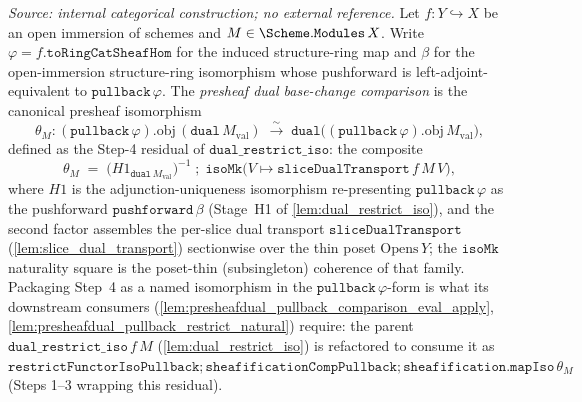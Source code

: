 \begin{definition}

  \label{def:presheafdual_pullback_comparison}
  \textit{Source: internal categorical construction; no external reference.}
  Let \(f : Y \hookrightarrow X\) be an open immersion of schemes and
  \(M \in \Scheme.\mathtt{Modules}\,X\). Write \(\varphi = f.\mathtt{toRingCatSheafHom}\) for the
  induced structure-ring map and \(\beta\) for the open-immersion structure-ring isomorphism whose
  pushforward is left-adjoint-equivalent to \(\mathtt{pullback}\,\varphi\). The \emph{presheaf dual
  base-change comparison} is the canonical presheaf isomorphism
  \[
    \theta_M : (\mathtt{pullback}\,\varphi).\mathrm{obj}\,(\mathtt{dual}\,M_{\mathrm{val}})
      \;\xrightarrow{\ \sim\ }\;
      \mathtt{dual}\bigl((\mathtt{pullback}\,\varphi).\mathrm{obj}\,M_{\mathrm{val}}\bigr),
  \]
  defined as the Step-4 residual of \(\mathtt{dual\_restrict\_iso}\): the composite
  \[
    \theta_M \;=\; \bigl(H1_{\mathtt{dual}\,M_{\mathrm{val}}}\bigr)^{-1}
      \;\mathbin{;}\; \mathtt{isoMk}\bigl(V \mapsto \mathtt{sliceDualTransport}\,f\,M\,V\bigr),
  \]
  where \(H1\) is the adjunction-uniqueness isomorphism re-presenting \(\mathtt{pullback}\,\varphi\) as
  the pushforward \(\mathtt{pushforward}\,\beta\) (Stage~H1 of \cref{lem:dual_restrict_iso}), and the
  second factor assembles the per-slice dual transport \(\mathtt{sliceDualTransport}\)
  (\cref{lem:slice_dual_transport}) sectionwise over the thin poset \(\mathrm{Opens}\,Y\); the
  \(\mathtt{isoMk}\) naturality square is the poset-thin (subsingleton) coherence of that family.
  Packaging Step~4 as a named isomorphism in the \(\mathtt{pullback}\,\varphi\)-form is what its
  downstream consumers (\cref{lem:presheafdual_pullback_comparison_eval_apply},
  \cref{lem:presheafdual_pullback_restrict_natural}) require: the parent
  \(\mathtt{dual\_restrict\_iso}\,f\,M\) (\cref{lem:dual_restrict_iso}) is refactored to consume it as
  \(\mathtt{restrictFunctorIsoPullback} \mathbin{;} \mathtt{sheafificationCompPullback}
  \mathbin{;} \mathtt{sheafification.mapIso}\,\theta_M\) (Steps 1--3 wrapping this residual).
\end{definition}

